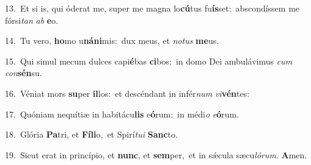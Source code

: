 {\numbfont\textcolor{\numbcolor}{13.}}~Et si is, qui óderat me, super me magna lo\-\textbf{cú}\-tus fu\-\textbf{ís}\-set:~\star abscondíssem me fórsi\textit{tan} \textit{ab} \textbf{e}\-o.\par
{\numbfont\textcolor{\numbcolor}{14.}}~Tu vero, \textbf{ho}\-mo u\-\textbf{ná}\-\textbf{ni}mis:~\star dux meus, et \textit{no}\-\textit{tus} \textbf{me}\-us.\par
{\numbfont\textcolor{\numbcolor}{15.}}~Qui simul mecum dulces capi\-\textbf{é}\-bas \textbf{ci}\-bos:~\star in domo Dei ambulávimus \textit{cum} \textit{con}\-\textbf{sén}su.\par
{\numbfont\textcolor{\numbcolor}{16.}}~Véniat mors \textbf{su}\-per \textbf{il}\-los:~\star et descéndant in infér\textit{num} \textit{vi}\-\textbf{vén}tes:\par
{\numbfont\textcolor{\numbcolor}{17.}}~Quóniam nequítiæ in habitácu\textbf{lis} e\-\textbf{ó}\-rum:~\star in médi\textit{o} \textit{e}\-\textbf{ó}rum.\par
{\numbfont\textcolor{\numbcolor}{18.}}~Glória \textbf{Pa}\-tri, et \textbf{Fí}\-\textbf{li}o,~\star et Spirí\-\textit{tu}\-\textit{i} \textbf{Sanc}\-to.\par
{\numbfont\textcolor{\numbcolor}{19.}}~Sicut erat in princípio, et \textbf{nunc}\-, et \textbf{sem}\-per,~\star et in sǽcula sæcu\-\textit{ló}\-\textit{rum}. \textbf{A}\-men.\par
